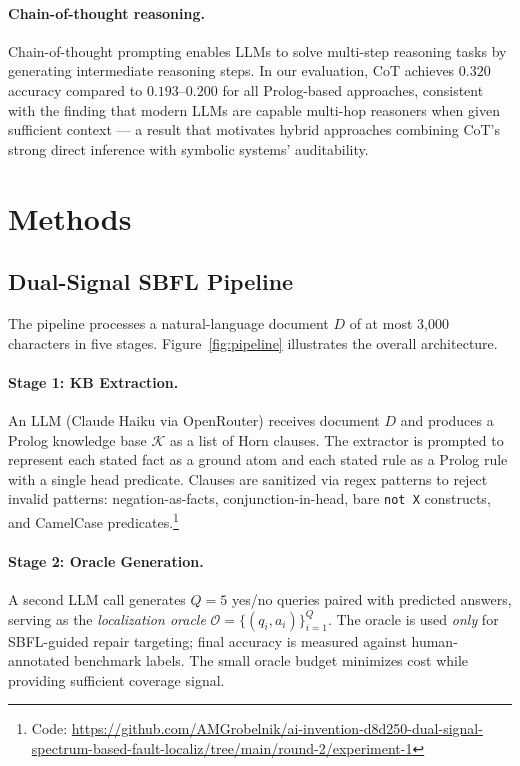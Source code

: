 \documentclass[11pt,letterpaper]{article}
\begin{document}
\paragraph{Chain-of-thought reasoning.} Chain-of-thought prompting \citep{Wei2022} enables LLMs to solve multi-step reasoning tasks by generating intermediate reasoning steps. In our evaluation, CoT achieves $0.320$ accuracy compared to $0.193$--$0.200$ for all Prolog-based approaches, consistent with the finding that modern LLMs are capable multi-hop reasoners when given sufficient context — a result that motivates hybrid approaches combining CoT's strong direct inference with symbolic systems' auditability.

\section{Methods}
\label{sec:methods}

\subsection{Dual-Signal SBFL Pipeline}

The pipeline processes a natural-language document $D$ of at most 3,000 characters in five stages. Figure~\ref{fig:pipeline} illustrates the overall architecture.

\paragraph{Stage 1: KB Extraction.} An LLM (Claude Haiku via OpenRouter) receives document $D$ and produces a Prolog knowledge base $\mathcal{K}$ as a list of Horn clauses. The extractor is prompted to represent each stated fact as a ground atom and each stated rule as a Prolog rule with a single head predicate. Clauses are sanitized via regex patterns to reject invalid patterns: negation-as-facts, conjunction-in-head, bare \texttt{not X} constructs, and CamelCase predicates.\footnote{Code: \url{https://github.com/AMGrobelnik/ai-invention-d8d250-dual-signal-spectrum-based-fault-localiz/tree/main/round-2/experiment-1}}

\paragraph{Stage 2: Oracle Generation.} A second LLM call generates $Q = 5$ yes/no queries paired with predicted answers, serving as the \emph{localization oracle} $\mathcal{O} = \{(q_i, a_i)\}_{i=1}^Q$. The oracle is used \emph{only} for SBFL-guided repair targeting; final accuracy is measured against human-annotated benchmark labels. The small oracle budget minimizes cost while providing sufficient coverage signal.
\end{document}
